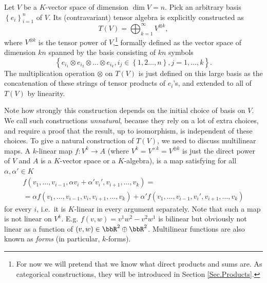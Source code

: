 \begin{example}\label{Tensor algebra}
Let $V$ be a $K$-vector space of dimension $\dim V=n$. Pick an
arbitrary basis $\left\{ e_{i}\right\} _{i=1}^{n}$ of $V$. Its (contravariant)
tensor algebra is explicitly constructed as 
\begin{equation}
T\left(V\right)=\bigoplus_{k=1}^{\infty}V^{\otimes k},\label{eq: tensor alg}
\end{equation}
where $V^{\otimes k}$ is the tensor power of $V$,\footnote{For now we will pretend that we know what direct products and sums are. As categorical constructions, they will be introduced in Section \ref{Sec.Products}.} formally defined
as the vector space of dimension $kn$ spanned by the basis consisting
of $kn$ symbols \[\left\{ e_{i_{1}}\otimes e_{i_{2}}\otimes\ldots\otimes e_{i_{k}},i_{j}\in\left\{ 1,2\ldots,n\right\} ,j=1,\ldots,k\right\}.\]
The multiplication operation $\otimes$ on $T(V)$ is just defined
on this large basis as the concatenation of these strings of tensor products
of $e_{i}$'s, and extended to all of $T\left(V\right)$ by linearity.

Note how strongly this construction depends on the initial choice
of basis on $V$. We call such constructions \emph{unnatural}, because
they rely on a lot of extra choices, and require a proof that the
result, up to isomorphism, is independent of these choices. To give
a natural construction of $T\left(V\right)$, we need to discuss multilinear
maps. A $k$-linear map $f:V^{k}\to A$ (where $V^k=V^{\times k}=V^{\oplus k}$ is just the direct power of $V$ and $A$ is a $K$-vector space or a $K$-algebra),
is a map satisfying for all $\alpha,\alpha'\in K$
\begin{multline}
    f\left(v_{1},\ldots,v_{i-1},\alpha v_{i}+\alpha'v_{i}',v_{i+1},\ldots,v_{k}\right)=\\=\alpha f\left(v_{1},\ldots,v_{i-1},v_{i},v_{i+1},\ldots,v_{k}\right)+\alpha'f\left(v_{1},\ldots,v_{i-1},v_{i}',v_{i+1},\ldots,v_{k}\right)
\end{multline}
for every $i$, i.e.\ it is $K$-linear in every argument separately.
Note that such a map is not linear on $V^{k}$. E.g. $f\left(v,w\right)=v^1w^2-v^2w^1$ is bilinear but obviously not linear as a function of $(v,w)\in \bbR^{2}\oplus \bbR^2$. Multilinear functions are also known as \emph{forms} (in particular, $k$-forms).


\end{example}
